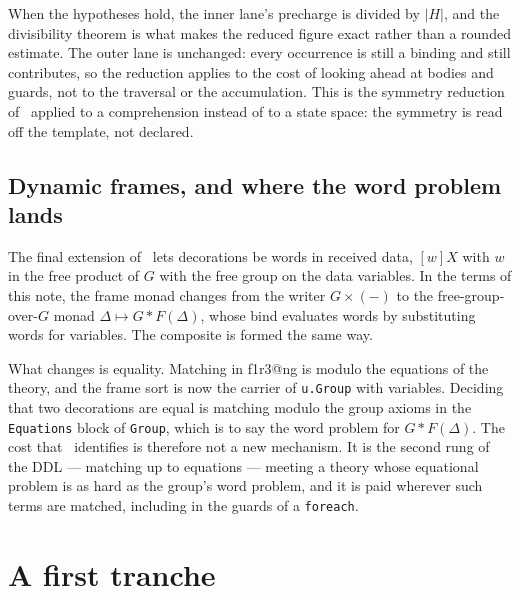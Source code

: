 \documentclass[11pt]{article}
\makeatletter
\theoremstyle{definition}
\theoremstyle{plain}
\theoremstyle{remark}
\newcommand{\fe}{\texttt{foreach}}
\newcommand{\flang}{\textsf{f1r3\textbar @ng}}
\makeatother
\begin{document}
When the hypotheses hold, the inner lane's precharge is divided by \(|H|\),
and the divisibility theorem is what makes the reduced figure exact rather than
a rounded estimate. The outer lane is unchanged: every occurrence is still a
binding and still contributes, so the reduction applies to the cost of looking
ahead at bodies and guards, not to the traversal or the accumulation. This
is the symmetry reduction of~\cite{Oriented} applied to a comprehension instead
of to a state space: the symmetry is read off the template, not declared.

\subsection{Dynamic frames, and where the word problem lands}

The final extension of~\cite{Oriented} lets decorations be words in received
data, \([w]X\) with \(w\) in the free product of \(G\) with the free group on
the data variables. In the terms of this note, the frame monad changes from
the writer \(G\times(-)\) to the free-group-over-\(G\) monad
\(\Delta\mapsto G * F(\Delta)\), whose bind evaluates words by substituting
words for variables. The composite is formed the same way.

What changes is equality. Matching in \flang{} is modulo the equations of the
theory, and the frame sort is now the carrier of \texttt{u.Group} with variables.
Deciding that two decorations are equal is matching modulo the group axioms in
the \texttt{Equations} block of \texttt{Group}, which is to say the word problem
for \(G * F(\Delta)\). The cost that~\cite{Oriented} identifies is therefore
not a new mechanism. It is the second rung of the DDL --- matching up to
equations --- meeting a theory whose equational problem is as hard as the group's
word problem, and it is paid wherever such terms are matched, including in the
guards of a \fe{}.

\section{A first tranche}
\label{sec:tranche}
\end{document}
